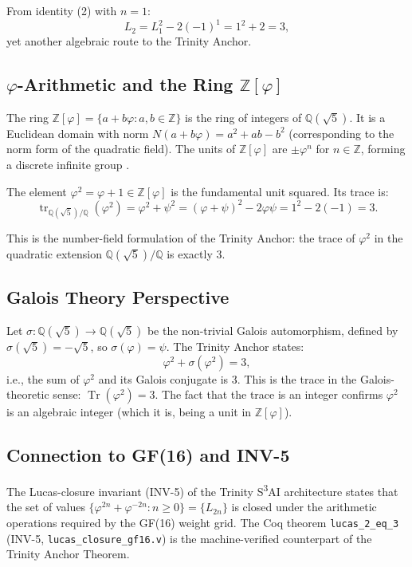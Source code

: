 From identity (2) with $n=1$:
\[
  L_{2} = L_{1}^{2}-2(-1)^{1} = 1^{2}+2 = 3,
\]
yet another algebraic route to the Trinity Anchor.

\subsection{$\varphi$-Arithmetic and the Ring $\mathbb{Z}[\varphi]$}

The ring $\mathbb{Z}[\varphi] = \{a + b\varphi : a,b \in \mathbb{Z}\}$
is the ring of integers of $\mathbb{Q}(\sqrt{5})$.
It is a Euclidean domain with norm $N(a+b\varphi) = a^{2}+ab-b^{2}$
(corresponding to the norm form of the quadratic field).
The units of $\mathbb{Z}[\varphi]$ are $\pm\varphi^{n}$ for
$n \in \mathbb{Z}$, forming a discrete infinite group \cite{vajda_fib_lucas}.

The element $\varphi^{2} = \varphi+1 \in \mathbb{Z}[\varphi]$
is the fundamental unit squared.
Its trace is:
\[
  \operatorname{tr}_{\mathbb{Q}(\sqrt{5})/\mathbb{Q}}(\varphi^{2})
  = \varphi^{2}+\psi^{2}
  = (\varphi+\psi)^{2} - 2\varphi\psi
  = 1^{2} - 2(-1)
  = 3.
\]

This is the number-field formulation of the Trinity Anchor:
the trace of $\varphi^{2}$ in the quadratic extension
$\mathbb{Q}(\sqrt{5})/\mathbb{Q}$ is exactly $3$.

\subsection{Galois Theory Perspective}

Let $\sigma: \mathbb{Q}(\sqrt{5}) \to \mathbb{Q}(\sqrt{5})$
be the non-trivial Galois automorphism, defined by
$\sigma(\sqrt{5}) = -\sqrt{5}$, so $\sigma(\varphi) = \psi$.
The Trinity Anchor states:
\[
  \varphi^{2} + \sigma(\varphi^{2}) = 3,
\]
i.e., the sum of $\varphi^{2}$ and its Galois conjugate is $3$.
This is the trace in the Galois-theoretic sense:
$\operatorname{Tr}(\varphi^{2}) = 3$.
The fact that the trace is an integer confirms $\varphi^{2}$
is an algebraic integer (which it is, being a unit in
$\mathbb{Z}[\varphi]$).

\subsection{Connection to GF(16) and INV-5}

The Lucas-closure invariant (INV-5) of the Trinity
S\textsuperscript{3}AI architecture states that the set of
values $\{\varphi^{2n}+\varphi^{-2n} : n \geq 0\} = \{L_{2n}\}$
is closed under the arithmetic operations required by the GF(16)
weight grid.
The Coq theorem \texttt{lucas\_2\_eq\_3} (INV-5,
\texttt{lucas\_closure\_gf16.v}) is the machine-verified
counterpart of the Trinity Anchor Theorem.

